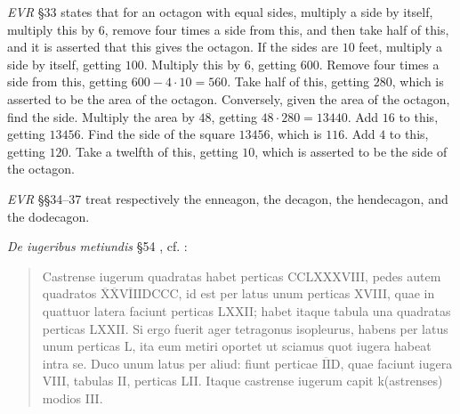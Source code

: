 {\em EVR} \S 33 \cite[pp.~178--179]{guillaumin} states that for an octagon with equal sides, 
multiply a side by itself, multiply this by $6$, remove four times a side from this, and then take half of this, and it is asserted that this gives the octagon.
If the sides are $10$ feet, multiply a side by itself, getting $100$. Multiply this by $6$, getting $600$. Remove four times a side from this,
getting $600-4\cdot 10=560$. Take half of this, getting $280$, which is asserted to be the area of the octagon. Conversely,
given the area of the octagon, find the side. Multiply the area by $48$, getting $48 \cdot 280 = 13440$. Add $16$ to this, getting $13456$. Find the side
of the square $13456$, which is $116$. Add $4$ to this, getting $120$. Take a twelfth of this, getting $10$, which is asserted to be the side
of the octagon. 

{\em EVR} \S \S 34--37 \cite[pp.~180--187]{guillaumin} treat respectively the enneagon, the decagon, the hendecagon, and the dodecagon. 

{\em De iugeribus metiundis} \S 54 \cite[pp.~198--201]{guillaumin}, cf.  \cite[p.~354--356]{blumeI}:

\begin{quote}
Castrense iugerum quadratas habet perticas CCLXXXVIII, pedes autem quadratos $\overline{\text{X}} \overline{\text{X}} \overline{\text{VIII}}$DCCC, 
id est per latus unum perticas XVIII, quae in quattuor latera faciunt perticas LXXII; habet itaque tabula una quadratas perticas LXXII. Si ergo
fuerit ager tetragonus isopleurus, habens per latus unum perticas L, ita eum metiri oportet ut sciamus quot iugera habeat intra se. Duco unum latus
per aliud: fiunt perticae $\overline{\text{II}}$D, quae faciunt iugera VIII, tabulas II, perticas LII. Itaque castrense iugerum capit k(astrenses) modios III.
\end{quote}

